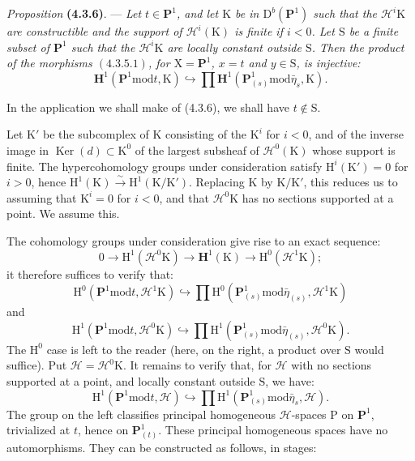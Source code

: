 \documentclass[11pt,leqno]{article}
\begin{document}
\textit{Proposition} \textbf{(4.3.6)}. — \textit{Let \(t\in\mathbf{P}^1\), and let \(\mathrm{K}\) be in \(\mathrm{D}^b(\mathbf{P}^1)\) such that the \(\mathscr{H}^i\mathrm{K}\) are constructible and the support of \(\mathscr{H}^i(\mathrm{K})\) is finite if \(i<0\). Let \(\mathrm{S}\) be a finite subset of \(\mathbf{P}^1\) such that the \(\mathscr{H}^i\mathrm{K}\) are locally constant outside \(\mathrm{S}\). Then the product of the morphisms \((4.3.5.1)\), for \(\mathrm{X}=\mathbf{P}^1\), \(x=t\) and \(y\in\mathrm{S}\), is injective:}
\[
\mathbf{H}^1(\mathbf{P}^1\mathbin{\mathrm{mod}}t,\mathrm{K})
\hookrightarrow
\prod\mathbf{H}^1(\mathbf{P}^1_{(s)}\mathbin{\mathrm{mod}}\bar\eta_s,\mathrm{K}).
\]

In the application we shall make of (4.3.6), we shall have \(t\notin\mathrm{S}\).

Let \(\mathrm{K}'\) be the subcomplex of \(\mathrm{K}\) consisting of the \(\mathrm{K}^i\) for \(i<0\), and of the inverse image in \(\operatorname{Ker}(d)\subset\mathrm{K}^0\) of the largest subsheaf of \(\mathscr{H}^0(\mathrm{K})\) whose support is finite. The hypercohomology groups under consideration satisfy \(\mathrm{H}^i(\mathrm{K}')=0\) for \(i>0\), hence \(\mathrm{H}^1(\mathrm{K})\xrightarrow{\sim}\mathrm{H}^1(\mathrm{K}/\mathrm{K}')\). Replacing \(\mathrm{K}\) by \(\mathrm{K}/\mathrm{K}'\), this reduces us to assuming that \(\mathrm{K}^i=0\) for \(i<0\), and that \(\mathscr{H}^0\mathrm{K}\) has no sections supported at a point. We assume this.

The cohomology groups under consideration give rise to an exact sequence:
\[
0\to\mathrm{H}^1(\mathscr{H}^0\mathrm{K})
\to\mathbf{H}^1(\mathrm{K})
\to\mathrm{H}^0(\mathscr{H}^1\mathrm{K});
\]
it therefore suffices to verify that:
\[
\mathrm{H}^0(\mathbf{P}^1\mathbin{\mathrm{mod}}t,\mathscr{H}^1\mathrm{K})
\hookrightarrow
\prod\mathrm{H}^0(\mathbf{P}^1_{(s)}\mathbin{\mathrm{mod}}\bar\eta_{(s)},\mathscr{H}^1\mathrm{K})
\]
and
\[
\mathrm{H}^1(\mathbf{P}^1\mathbin{\mathrm{mod}}t,\mathscr{H}^0\mathrm{K})
\hookrightarrow
\prod\mathrm{H}^1(\mathbf{P}^1_{(s)}\mathbin{\mathrm{mod}}\bar\eta_{(s)},\mathscr{H}^0\mathrm{K}).
\]
The \(\mathrm{H}^0\) case is left to the reader (here, on the right, a product over \(\mathrm{S}\) would suffice). Put \(\mathscr{H}=\mathscr{H}^0\mathrm{K}\). It remains to verify that, for \(\mathscr{H}\) with no sections supported at a point, and locally constant outside \(\mathrm{S}\), we have:
\[
\mathrm{H}^1(\mathbf{P}^1\mathbin{\mathrm{mod}}t,\mathscr{H})
\hookrightarrow
\prod\mathrm{H}^1(\mathbf{P}^1_{(s)}\mathbin{\mathrm{mod}}\bar\eta_s,\mathscr{H}).
\]
The group on the left classifies principal homogeneous \(\mathscr{H}\)-spaces \(\mathrm{P}\) on \(\mathbf{P}^1\), trivialized at \(t\), hence on \(\mathbf{P}^1_{(t)}\). These principal homogeneous spaces have no automorphisms. They can be constructed as follows, in stages:
\end{document}
